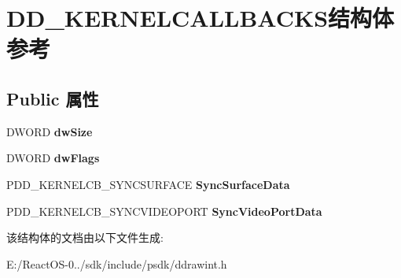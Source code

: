 \hypertarget{struct_d_d___k_e_r_n_e_l_c_a_l_l_b_a_c_k_s}{}\section{D\+D\+\_\+\+K\+E\+R\+N\+E\+L\+C\+A\+L\+L\+B\+A\+C\+K\+S结构体 参考}
\label{struct_d_d___k_e_r_n_e_l_c_a_l_l_b_a_c_k_s}
\subsection*{Public 属性}
\begin{DoxyCompactItemize}
\item 
\mbox{\label{struct_d_d___k_e_r_n_e_l_c_a_l_l_b_a_c_k_s_a3d2483da65f0c0058833de033822f9b7}} 
D\+W\+O\+RD {\bfseries dw\+Size}
\item 
\mbox{\label{struct_d_d___k_e_r_n_e_l_c_a_l_l_b_a_c_k_s_ad2f43b27f8de38200d9a0e47dfcd61f6}} 
D\+W\+O\+RD {\bfseries dw\+Flags}
\item 
\mbox{\label{struct_d_d___k_e_r_n_e_l_c_a_l_l_b_a_c_k_s_aecf2979b0e306cbb7f70d7239c4db30e}} 
P\+D\+D\+\_\+\+K\+E\+R\+N\+E\+L\+C\+B\+\_\+\+S\+Y\+N\+C\+S\+U\+R\+F\+A\+CE {\bfseries Sync\+Surface\+Data}
\item 
\mbox{\label{struct_d_d___k_e_r_n_e_l_c_a_l_l_b_a_c_k_s_adbe473b8c405bbe94ff72b7a5bcf6de3}} 
P\+D\+D\+\_\+\+K\+E\+R\+N\+E\+L\+C\+B\+\_\+\+S\+Y\+N\+C\+V\+I\+D\+E\+O\+P\+O\+RT {\bfseries Sync\+Video\+Port\+Data}
\end{DoxyCompactItemize}


该结构体的文档由以下文件生成\+:\begin{DoxyCompactItemize}
\item 
E\+:/\+React\+O\+S-\/0../sdk/include/psdk/ddrawint.\+h\end{DoxyCompactItemize}
